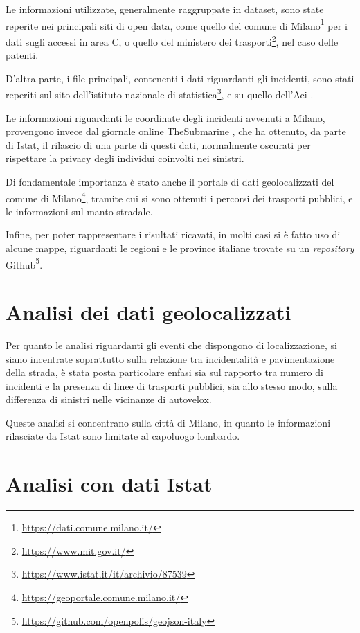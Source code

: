 \documentclass[a4paper]{article}
\begin{document}
Le informazioni utilizzate, generalmente raggruppate in dataset, sono 
state reperite nei principali siti di open data, come quello del comune di 
Milano\footnote{\url{https://dati.comune.milano.it/}} per i dati sugli accessi in area C, 
o quello del ministero dei trasporti\footnote{\url{https://www.mit.gov.it/}}, 
nel caso delle patenti.

D'altra parte, i file principali, contenenti i dati riguardanti gli incidenti, sono 
stati reperiti sul sito 
dell'istituto nazionale di statistica\footnote{\url{https://www.istat.it/it/archivio/87539}}, 
e su quello dell'Aci \cite{ACI:1}. 

Le informazioni riguardanti le coordinate degli incidenti avvenuti a Milano, provengono invece 
dal giornale online TheSubmarine \cite{SUBMARINE:1}, 
che ha ottenuto, da parte di Istat, il rilascio di una parte di questi dati, 
normalmente oscurati per rispettare la privacy degli individui coinvolti nei sinistri. 


Di fondamentale importanza è stato anche il portale di dati geolocalizzati del comune di 
Milano\footnote{\url{https://geoportale.comune.milano.it/}}, 
tramite cui si sono ottenuti i percorsi dei trasporti pubblici, e le 
informazioni sul manto stradale.

Infine, per poter rappresentare i risultati ricavati, in molti casi si è fatto uso di 
alcune mappe, riguardanti le regioni e le province italiane trovate su un \textit{repository} 
Github\footnote{\url{https://github.com/openpolis/geojson-italy}}.

\section{Analisi dei dati geolocalizzati}

Per quanto le analisi riguardanti gli eventi che dispongono di localizzazione, 
si siano incentrate soprattutto sulla relazione tra incidentalità e pavimentazione 
della strada, è stata posta particolare enfasi sia sul rapporto tra numero di 
incidenti e la presenza di linee di trasporti pubblici, sia 
allo stesso modo, sulla differenza di sinistri nelle vicinanze di autovelox. 

Queste analisi si concentrano sulla città di Milano, in quanto le informazioni rilasciate da 
Istat sono limitate al capoluogo lombardo.

\section{Analisi con dati Istat}
\end{document}
